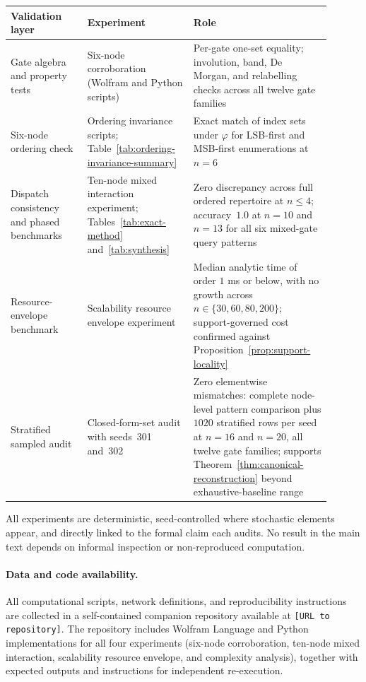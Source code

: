\documentclass[11pt]{article}
\theoremstyle{definition}
\begin{document}
\begin{center}
\small
\begin{tabular}{p{0.22\linewidth}p{0.30\linewidth}p{0.38\linewidth}}
\toprule
\textbf{Validation layer} & \textbf{Experiment} & \textbf{Role} \\
\midrule
Gate algebra and property tests &
Six-node corroboration (Wolfram and Python scripts) &
Per-gate one-set equality; involution, band, De Morgan, and relabelling checks across all twelve gate families \\[4pt]

Six-node ordering check &
Ordering invariance scripts; Table~\ref{tab:ordering-invariance-summary} &
Exact match of index sets under \(\varphi\) for LSB-first and MSB-first enumerations at \(n=6\) \\[4pt]

Dispatch consistency and phased benchmarks &
Ten-node mixed interaction experiment; Tables~\ref{tab:exact-method} and~\ref{tab:synthesis} &
Zero discrepancy across full ordered repertoire at \(n\leq 4\); accuracy~\(1.0\) at \(n=10\) and \(n=13\) for all six mixed-gate query patterns \\[4pt]

Resource-envelope benchmark &
Scalability resource envelope experiment &
Median analytic time of order \(1\) ms or below, with no growth across \(n\in\{30,60,80,200\}\); support-governed cost confirmed against Proposition~\ref{prop:support-locality} \\[4pt]

Stratified sampled audit &
Closed-form-set audit with seeds~301 and~302 &
Zero elementwise mismatches: complete node-level pattern comparison plus \(1020\) stratified rows per seed at \(n=16\) and \(n=20\), all twelve gate families; supports Theorem~\ref{thm:canonical-reconstruction} beyond exhaustive-baseline range \\
\bottomrule
\end{tabular}
\end{center}

All experiments are deterministic, seed-controlled where stochastic elements appear, and directly linked to the formal claim each audits. No result in the main text depends on informal inspection or non-reproduced computation.

\paragraph{Data and code availability.}
All computational scripts, network definitions, and reproducibility instructions are collected in a self-contained companion repository available at \texttt{[URL to repository]}. The repository includes Wolfram Language and Python implementations for all four experiments (six-node corroboration, ten-node mixed interaction, scalability resource envelope, and complexity analysis), together with expected outputs and instructions for independent re-execution.
\end{document}
